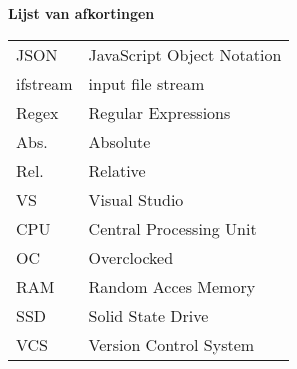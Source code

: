 \Large
\textbf{Lijst van afkortingen}
\newline
\small
\begin{table}[ht]
\small
\begin{tabular}{ll} 
JSON        & JavaScript Object Notation \\
ifstream    & input file stream \\
Regex       & Regular Expressions \\
Abs.        & Absolute \\
Rel.        & Relative \\
VS          & Visual Studio \\
CPU         & Central Processing Unit \\
OC          & Overclocked \\
RAM         & Random Acces Memory \\
SSD         & Solid State Drive \\
VCS         & Version Control System \\
\end{tabular}
\end{table}

\newpage
